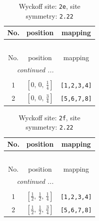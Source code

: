 \documentclass[fleqn,8pt]{jsarticle}
\begin{document}
\begin{longtable}{ccc}
\caption{Wyckoff site: {\tt 2e}, site symmetry: {\tt 2.22}}
 \\
 \hline \hline
No. & position & mapping \\ \hline \endfirsthead

\multicolumn{2}{l}{\tablename\ \thetable{}} \\
 \hline \hline
No. & position & mapping \\ \hline \endhead

 \hline \hline
\multicolumn{2}{r}{\footnotesize\it continued ...} \\ \endfoot

 \hline \hline
\multicolumn{2}{r}{} \\ \endlastfoot

1 & $\left[ 0,\, 0,\, \frac{1}{4} \right]$ & {\tt [1,2,3,4]} \\ \hline
2 & $\left[ 0,\, 0,\, \frac{3}{4} \right]$ & {\tt [5,6,7,8]} \\
\end{longtable}
\renewcommand{\arraystretch}{1.2}
\begin{longtable}{ccc}
\caption{Wyckoff site: {\tt 2f}, site symmetry: {\tt 2.22}}
 \\
 \hline \hline
No. & position & mapping \\ \hline \endfirsthead

\multicolumn{2}{l}{\tablename\ \thetable{}} \\
 \hline \hline
No. & position & mapping \\ \hline \endhead

 \hline \hline
\multicolumn{2}{r}{\footnotesize\it continued ...} \\ \endfoot

 \hline \hline
\multicolumn{2}{r}{} \\ \endlastfoot

1 & $\left[ \frac{1}{2},\, \frac{1}{2},\, \frac{1}{4} \right]$ & {\tt [1,2,3,4]} \\ \hline
2 & $\left[ \frac{1}{2},\, \frac{1}{2},\, \frac{3}{4} \right]$ & {\tt [5,6,7,8]} \\
\end{longtable}
\renewcommand{\arraystretch}{1.2}
\end{document}

